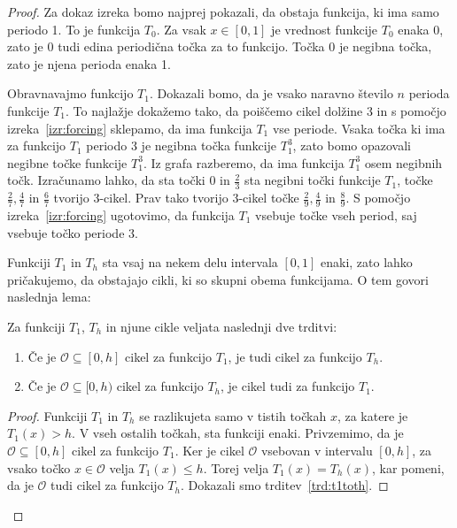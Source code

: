 \documentclass[../TG_magistrsko_delo_sections.tex]{subfiles}
\begin{document}
\begin{proof}
Za dokaz izreka bomo najprej pokazali, da obstaja funkcija, ki ima samo periodo 1. To je funkcija $T_0$. Za vsak $x \in [0, 1]$ je vrednost funkcije $T_0$ enaka 0, zato je 0 tudi edina periodična točka za to funkcijo. Točka 0 je negibna točka, zato je njena perioda enaka 1.

Obravnavajmo funkcijo $T_1$. Dokazali bomo, da je vsako naravno število $n$ perioda funkcije $T_1$. To najlažje dokažemo tako, da poiščemo cikel dolžine 3 in s pomočjo izreka~\ref{izr:forcing} sklepamo, da ima funkcija $T_1$ vse periode. Vsaka točka ki ima za funkcijo $T_1$ periodo 3 je negibna točka funkcije $T_1^3$, zato bomo opazovali negibne točke funkcije $T_1^3$. Iz grafa razberemo, da ima funkcija $T_1^3$ osem negibnih točk. Izračunamo lahko, da sta točki 0 in $\frac{2}{3}$ sta negibni točki funkcije $T_1$, točke $\frac{2}{7}, \frac{4}{7}$ in $\frac{6}{7}$ tvorijo 3-cikel. Prav tako tvorijo 3-cikel točke  $\frac{2}{9}, \frac{4}{9}$ in $\frac{8}{9}$. S pomočjo izreka~\ref{izr:forcing} ugotovimo, da funkcija $T_1$ vsebuje točke vseh period, saj vsebuje točko periode 3.

Funkciji $T_1$ in $T_h$ sta vsaj na nekem delu intervala $[0, 1]$ enaki, zato lahko pričakujemo, da obstajajo cikli, ki so skupni obema funkcijama. O tem govori naslednja lema:
\begin{lema}\label{lem:t1th}
Za funkciji $T_1$, $T_h$ in njune cikle  veljata naslednji dve trditvi:
\begin{enumerate}[label={(\arabic*)}]
\item Če je $\mathcal{O} \subseteq [0, h]$ cikel za funkcijo $T_1$, je tudi cikel za funkcijo $T_h$. \label{trd:t1toth}
\item Če je $\mathcal{O} \subseteq [0, h)$ cikel za funkcijo $T_h$, je cikel tudi za funkcijo $T_1$. \label{trd:thtot1}
\end{enumerate}
\end{lema}
\begin{proof}
Funkciji $T_1$ in $T_h$ se razlikujeta samo v tistih točkah $x$, za katere je $T_1(x) > h$. V vseh ostalih točkah, sta funkciji enaki. Privzemimo, da je $\mathcal{O} \subseteq [0, h]$ cikel za funkcijo $T_1$. Ker je cikel $\mathcal{O}$ vsebovan v intervalu $[0, h]$, za vsako točko $x \in \mathcal{O}$ velja $T_1(x) \leq h$. Torej velja $T_1(x)=T_h(x)$, kar pomeni, da je $\mathcal{O}$ tudi cikel za funkcijo $T_h$. Dokazali smo trditev~\ref{trd:t1toth}.


\end{proof}
\end{proof}
\end{document}
